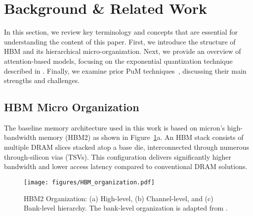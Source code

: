 





\section{Background \& Related Work}
In this section, we review key terminology and concepts that are essential for understanding the content of this paper. First, we introduce the structure of HBM and its hierarchical micro-organization. Next, we provide an overview of attention-based models, focusing on the exponential quantization technique described in \cite{DNA-TEQ}. Finally, we examine prior PuM techniques~\cite{pluto,red-LUT}, discussing their main strengths and challenges.

\subsection{HBM Micro Organization}\label{HBM_organization}
The baseline memory architecture used in this work is based on micron's high-bandwidth memory (HBM2) as shown in Figure~\ref{fig:HBM_organization}a. An HBM stack consists of multiple DRAM slices stacked atop a base die, interconnected through numerous through-silicon vias (TSVs). This configuration delivers significantly higher bandwidth and lower access latency compared to conventional DRAM solutions.

\begin{figure}[t!]
\centering
\texttt{[image: figures/HBM\_organization.pdf]}
\caption{HBM2 Organization: (a) High-level, (b) Channel-level, and (c) Bank-level hierarchy. The bank-level organization is adapted from \cite{fine-grained}.}
\label{fig:HBM_organization}
\vskip -0.15in
\end{figure}

